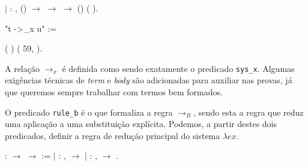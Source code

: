 \coqdocnoindent \ensuremath{|}  :
\coqdockw{\ensuremath{\forall}}   ,
(\coqdocnotation{[}\coqdocnotation{]})
\ensuremath{\rightarrow} 
  \ensuremath{\rightarrow}
  \ensuremath{\rightarrow} \coqdoceol
\coqdocindent{1.00em} 
(\coqdocnotation{[}\coqdocnotation{][}\coqdocnotation{]})
(\coqdocnotation{((}\coqdocnotation{\&}
\coqdocnotation{)[}\coqdocnotation{])[}
\coqdocnotation{[}  \coqdocnotation{]}
\coqdocnotation{]}).\coqdoceol \coqdocemptyline

\coqdocnoindent
{} "t ->\_x u" :=


(  )
(  59, 
).\coqdoceol
\bigskip

A relação $\rightarrow_x$ é definida como sendo exatamente o predicado
\texttt{sys\_x}. Algumas exigências técnicas de \emph{term} e \emph{body} são
adicionadas para auxiliar nas provas, já que queremos sempre trabalhar com
termos bem formados.

O predicado \texttt{rule\_b} é o que formaliza a regra $\rightarrow_B$, sendo
esta a regra que reduz uma aplicação a uma substituição explícita. Podemos, a
partir destes dois predicados, definir a regra de redução principal do sistema
$\lambda ex$.

\bigskip
\coqdocnoindent {} : 
\ensuremath{\rightarrow}  \ensuremath{\rightarrow}
 := \coqdoceol
\coqdocnoindent \ensuremath{|}  : \coqdockw{\ensuremath{\forall}} 
,    \ensuremath{\rightarrow}
 
\coqdoceol \coqdocnoindent \ensuremath{|} 
: \coqdockw{\ensuremath{\forall}}  ,
   \ensuremath{\rightarrow}
 
.\coqdoceol

